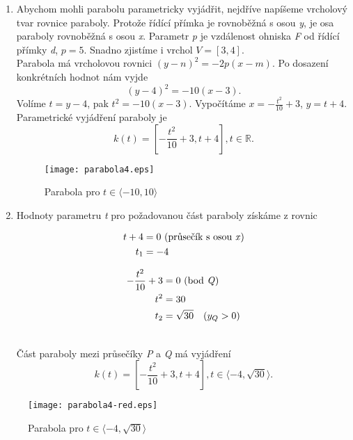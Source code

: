 		\noindent\begin{enumerate}
		\item Abychom mohli parabolu parametricky vyjádřit, nejdříve napíšeme vrcholový tvar rovnice paraboly.
		Protože řídící přímka je rovnoběžná s osou \textit{y}, je osa paraboly rovnoběžná s osou \textit{x}.
		Parametr \textit{p} je vzdálenost ohniska \textit{F} od řídící přímky \textit{d}, $p=5$. Snadno zjistíme i vrchol $V=[3,4]$. \\
		Parabola má vrcholovou rovnici $(y-n)^2=-2p(x-m)$.
		Po dosazení konkrétních hodnot nám vyjde
		$$(y-4)^2=-10(x-3).$$
		Volíme $t=y-4$, pak $t^2=-10(x-3)$. Vypočítáme $x=-\frac{t^2}{10}+3$, $y=t+4$.\\
		Parametrické vyjádření paraboly je
		$$k(t) = \left[-\frac{t^2}{10}+3, t+4\right], t \in \mathbb{R}.$$
		\vfill
		\begin{figure}[H]
			\centering
			\texttt{[image: parabola4.eps]}
			\caption{Parabola pro $t \in \langle-10, 10\rangle$}
								
		\end{figure}
		\item
		Hodnoty parametru \textit{t} pro požadovanou část paraboly získáme z rovnic
									
		\noindent\begin{minipage}[t]{0.5\textwidth}
		\begin{align*}
			t + 4 & = 0 \text{ (průsečík s osou \textit{x})} \\
			t_1   & = -4                                        
		\end{align*}
		\end{minipage}
		\noindent\begin{minipage}[t]{0.5\textwidth}
		\begin{align*}
			-\frac{t^2}{10}+3 & = 0 \text{ (bod \textit{Q})} \\
			t^2               & = 30                         \\
			t_2               & = \sqrt{30} \quad (y_Q>0)    
		\end{align*}
		\end{minipage}
		\\[10pt]
		Část paraboly mezi průsečíky \textit{P} a \textit{Q} má vyjádření
		$$k(t) = \left[-\frac{t^2}{10}+3, t+4\right], t \in \langle-4, \sqrt{30}\rangle.$$
		\end{enumerate}
		\vfill
		\begin{figure}[H]
			\centering
			\texttt{[image: parabola4-red.eps]}
			\caption{Parabola pro $t \in \langle-4, \sqrt{30}\rangle$}
								
		\end{figure}
		\clearpage		
